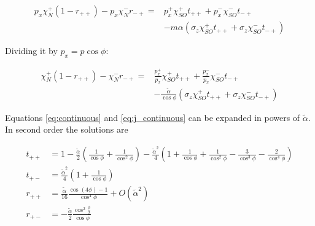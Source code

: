 \documentclass[11pt]{article}
\newcommand{\ta}{\tilde \alpha}
\begin{document}
\begin{align}
    p_x \chi_N^+ (1 - r_{++}) - p_x \chi_N^- r_{-+}
        =& p_x^+ \chi_{SO}^+ t_{++} + p_x^- \chi_{SO}^- t_{-+} \nonumber\\
         &   - m \alpha \left(  \sigma_z \chi_{SO}^+ t_{++}
                            + \sigma_z \chi_{SO}^- t_{-+} \right)
\end{align}

Dividing it by  $p_x = p \cos \phi$: 

\begin{align}
    \chi_N^+ (1 - r_{++}) - \chi_N^- r_{-+}
        =& \frac{p_x^+}{p_x} \chi_{SO}^+ t_{++} + \frac{p_x^-}{p_x} \chi_{SO}^- t_{-+} \nonumber\\
         &   - \frac{\ta}{\cos \phi} \left(\sigma_z \chi_{SO}^+
                 t_{++} + \sigma_z \chi_{SO}^- t_{-+} \right)
                                \label{eq:j_continuous}
\end{align}

Equations \ref{eq:continuous} and \ref{eq:j_continuous} can be
expanded in powers of $\ta$. In second order the solutions are

\begin{align}
    t_{++} &= 1 -
            \frac{\ta}{2}(\frac{1}{\cos \phi} + \frac{1}{\cos^2 \phi})
            -\frac{\ta^2}{4}(1+\frac{1}{\cos \phi} + \frac{1}{\cos^2 \phi}
                    -\frac{3}{\cos^3\phi} - \frac{2}{\cos^4\phi})\\
    t_{+-} &= \frac{\ta^2}{4}(1 + \frac{1}{\cos \phi})\\
    r_{++} &= \frac{\ta}{16}\frac{\cos(4 \phi) -1}{\cos^4 \phi}  +
            O(\ta^2)\\
    r_{+-} &= -\frac{\ta}{2} \frac{\cos^2\frac{\phi}{2}}{\cos \phi}
\end{align}

\end{document}
